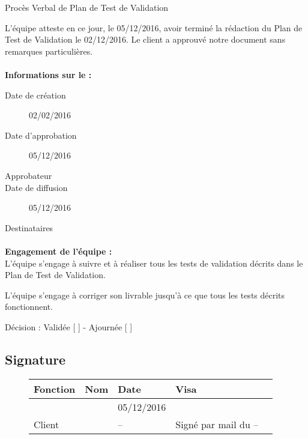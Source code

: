 \documentclass[asi, sansVersion]{picInsa}
\begin{document}
 
 \begin{center}
  \LARGE{}
    Procès Verbal de Plan de Test de Validation\\
 \end{center}
 
 \normalsize{}
 
L'équipe \nomEquipe{} atteste en ce jour, le 05/12/2016, avoir terminé la rédaction du Plan de Test de Validation le 02/12/2016.
Le client a approuvé notre document sans remarques particulières.


\paragraph{}
\textbf{Informations sur le \PTVCourt :}

\begin{description}
  \item[Date de création]02/02/2016
  \item[Date d'approbation]05/12/2016
  \item[Approbateur]\nomClient
  \item[Date de diffusion]05/12/2016
  \item[Destinataires]\nomEquipe
\end{description}

\paragraph{}
\textbf{Engagement de l'équipe :}\\


L'équipe \nomEquipe{} s'engage à suivre et à réaliser tous les tests de validation décrits dans le Plan de Test de Validation.


L'équipe \nomEquipe{} s'engage à corriger son livrable jusqu'à ce que tous les tests décrits fonctionnent.


\begin{center}
Décision : Validée [ \checkmark{} ] - Ajournée [ ]
\end{center}

\subsection*{Signature}
\begin{figure}[H]
		\centering
		\begin{tabularx}{17cm}{|p{4cm}|X|X|X|X|}
		\hline
		\rowcolor[gray]{0.85} Fonction & Nom & Date & Visa \\
		\hline
		\CP{} & \Pierre{} & 05/12/2016 & \\
		\hline
		Client & \nomClient & -- & Signé par mail du --\\
		\hline
		\end{tabularx}
\end{figure}
\end{document}
